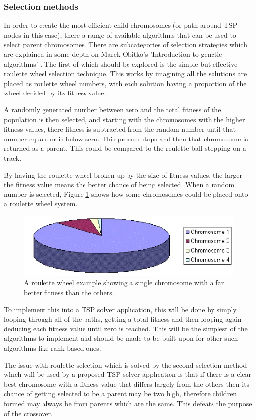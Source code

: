 \documentclass[article]{IEEEtran}
\begin{document}
\subsubsection{Selection methods}
In order to create the most efficient child chromosomes (or path around TSP nodes in this case), there a range of available algorithms that can be used to select parent chromosomes. There are subcategories of selection strategies which are explained in some depth on Marek Obitko's 'Introduction to genetic algorithms' \cite{6}. The first of which should be explored is the simple but effective roulette wheel selection technique. This works by imagining all the solutions are placed as roulette wheel numbers, with each solution having a proportion of the wheel decided by its fitness value. \par
A randomly generated number between zero and the total fitness of the population is then selected, and starting with the chromosomes with the higher fitness values, there fitness is subtracted from the random number until that number equals or is below zero. This process stops and then that chromosome is returned as a parent. This could be compared to the roulette ball stopping on a track. \par
By having the roulette wheel broken up by the size of fitness values, the larger the fitness value means the better chance of being selected. When a random number is selected, Figure \ref{fig:3} shows how some chromosomes could be placed onto a roulette wheel system. 
\begin{figure}[H]
\centering
\includegraphics[width=.8\linewidth]{images/rouletteWheel}
\caption{A roulette wheel example showing a single chromosome with a far better fitness than the others.}
\label{fig:3}
\end{figure}
To implement this into a TSP solver application, this will be done by simply looping through all of the paths, getting a total fitness and then looping again deducing each fitness value until zero is reached. This will be the simplest of the algorithms to implement and should be made to be built upon for other such algorithms like rank based ones. \par
The issue with roulette selection which is solved by the second selection method which will be used by a proposed TSP solver application is that if there is a clear best chromosome with a fitness value that differs largely from the others then its chance of getting selected to be a parent may be two high, therefore children formed may always be from parents which are the same. This defeats the purpose of the crossover. \par
\end{document}
